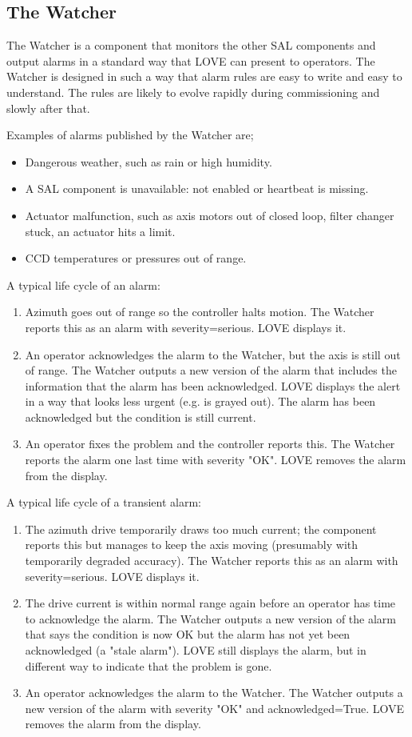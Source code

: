 \subsection{The Watcher}\label{sect:watcher}
The Watcher is a component that monitors the other SAL components and output alarms in a standard way that LOVE can present to operators. The Watcher is designed in such a way that alarm rules are easy to write and easy to understand. The rules are likely to evolve rapidly during commissioning and slowly after that.

Examples of alarms published by the Watcher are;
%
\begin{itemize}
\item Dangerous weather, such as rain or high humidity.
\item A SAL component is unavailable: not enabled or heartbeat is missing.
\item Actuator malfunction, such as axis motors out of closed loop, filter changer stuck, an actuator hits a limit.
\item CCD temperatures or pressures out of range.
\end{itemize}

A typical life cycle of an alarm:
\begin{enumerate}
\item Azimuth goes out of range so the controller halts motion. The Watcher reports this as an alarm with severity=serious. LOVE displays it.
\item An operator acknowledges the alarm to the Watcher, but the axis is still out of range. The Watcher outputs a new version of the alarm that includes the information that the alarm has been acknowledged. LOVE displays the alert in a way that looks less urgent (e.g. is grayed out). The alarm has been acknowledged but the condition is still current.
\item An operator fixes the problem and the controller reports this. The Watcher reports the alarm one last time with severity "OK". LOVE removes the alarm from the display.
\end{enumerate}

A typical life cycle of a transient alarm:
\begin{enumerate}
\item The azimuth drive temporarily draws too much current; the component reports this but manages to keep the axis moving (presumably with temporarily degraded accuracy). The Watcher reports this as an alarm with severity=serious. LOVE displays it.
\item The drive current is within normal range again before an operator has time to acknowledge the alarm. The Watcher outputs a new version of the alarm that says the condition is now OK but the alarm has not yet been acknowledged (a "stale alarm"). LOVE still displays the alarm, but in different way to indicate that the problem is gone.
\item An operator acknowledges the alarm to the Watcher. The Watcher outputs a new version of the alarm with severity "OK" and acknowledged=True. LOVE removes the alarm from the display.
\end{enumerate}


